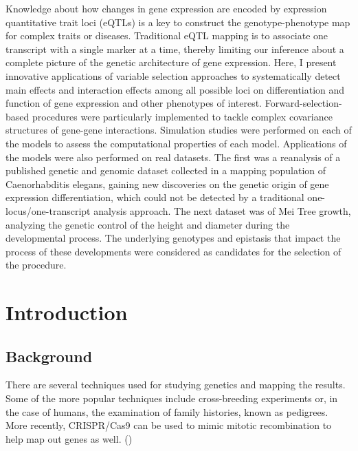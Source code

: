 \documentclass[11pt,]{book}
\theoremstyle{definition}
\theoremstyle{definition}
\theoremstyle{remark}
\begin{document}
\begin{center}
Knowledge about how changes in gene expression are encoded by expression quantitative trait loci (eQTLs) is a key to construct the genotype-phenotype map for complex traits or diseases. Traditional eQTL mapping is to associate one transcript with a single marker at a time, thereby limiting our inference about a complete picture of the genetic architecture of gene expression. Here, I present innovative applications of variable selection approaches to systematically detect main effects and interaction effects among all possible loci on differentiation and function of gene expression and other phenotypes of interest. Forward-selection-based procedures were particularly implemented to tackle complex covariance structures of gene-gene interactions. Simulation studies were performed on each of the models to assess the computational properties of each model.  Applications of the models were also performed on real datasets.  The first was a reanalysis of a published genetic and genomic dataset collected in a mapping population of Caenorhabditis elegans, gaining new discoveries on the genetic origin of gene expression differentiation, which could not be detected by a traditional one-locus/one-transcript analysis approach.  The next dataset was of Mei Tree growth, analyzing the genetic control of the height and diameter during the developmental process.  The underlying genotypes and epistasis that impact the process of these developments were considered as candidates for the selection of the procedure.

\end{center}

{
\setcounter{tocdepth}{1}
\tableofcontents
}
\listoftables
\listoffigures
\chapter{Introduction}\label{intro}

 \setcounter{page}{1}

\section{Background}\label{background}

There are several techniques used for studying genetics and mapping the
results. Some of the more popular techniques include cross-breeding
experiments or, in the case of humans, the examination of family
histories, known as pedigrees. More recently, CRISPR/Cas9 can be used to
mimic mitotic recombination to help map out genes as well.
(\cite{sadhu2016crispr})
\end{document}
